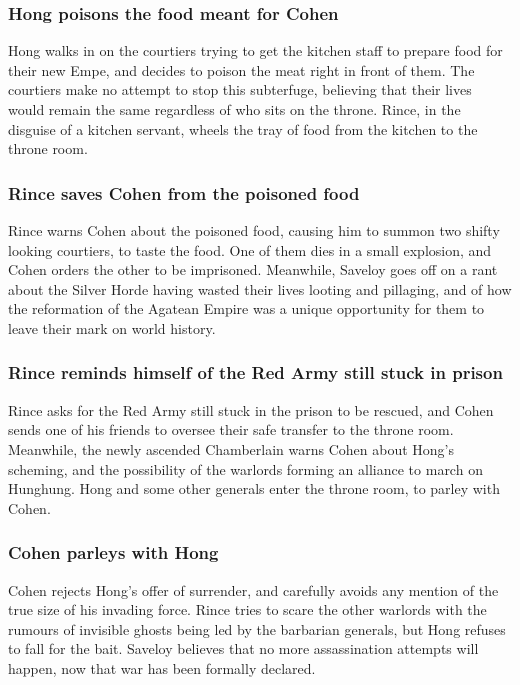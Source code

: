 \subsubsection{\Gls{Hong} poisons the food meant for \Gls{Cohen}}
\Gls{Hong} walks in on the courtiers trying to get the kitchen staff to prepare food for their
new \Gls{Empe}, and decides to poison the meat right in front of them. The courtiers make no attempt
to stop this subterfuge, believing that their lives would remain the same regardless of who sits on
the throne. \Gls{Rince}, in the disguise of a kitchen servant, wheels the tray of food from the
kitchen to the throne room.

\subsubsection{\Gls{Rince} saves \Gls{Cohen} from the poisoned food}
\Gls{Rince} warns \Gls{Cohen} about the poisoned food, causing him to summon two shifty looking
courtiers, to taste the food. One of them dies in a small explosion, and \Gls{Cohen} orders the
other to be imprisoned. Meanwhile, \Gls{Saveloy} goes off on a rant about the Silver Horde having
wasted their lives looting and pillaging, and of how the reformation of the Agatean Empire was a
unique opportunity for them to leave their mark on world history.

\subsubsection{\Gls{Rince} reminds himself of the Red Army still stuck in prison}
\Gls{Rince} asks for the Red Army still stuck in the prison to be rescued, and \Gls{Cohen} sends one
of his friends to oversee their safe transfer to the throne room. Meanwhile, the newly ascended
Chamberlain warns \Gls{Cohen} about \Gls{Hong}'s scheming, and the possibility of the warlords
forming an alliance to march on Hunghung. \Gls{Hong} and some other generals enter the throne room,
to parley with \Gls{Cohen}.

\subsubsection{\Gls{Cohen} parleys with \Gls{Hong}}
\Gls{Cohen} rejects \Gls{Hong}'s offer of surrender, and carefully avoids any mention of the true
size of his invading force. \Gls{Rince} tries to scare the other warlords with the rumours of
invisible ghosts being led by the barbarian generals, but \Gls{Hong} refuses to fall for the bait.
\Gls{Saveloy} believes that no more assassination attempts will happen, now that war has been
formally declared.

